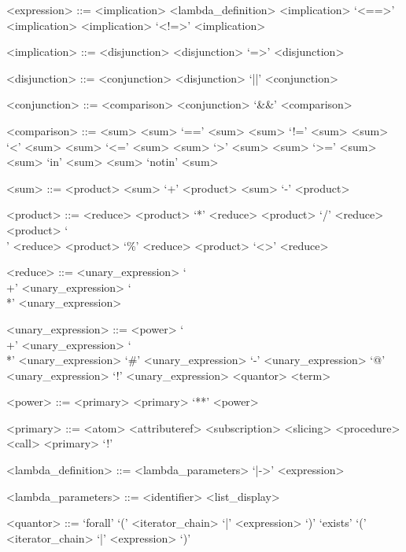 \begin{grammar}
<expression> ::= <implication>
\alt <lambda_definition>
\alt <implication> `<==>' <implication>
\alt <implication> `<!=>' <implication>

<implication> ::= <disjunction>
\alt <disjunction> `=>' <disjunction>

<disjunction> ::= <conjunction>
\alt <disjunction> `||' <conjunction>

<conjunction> ::= <comparison>
\alt <conjunction> `&&' <comparison>

<comparison> ::= <sum>
\alt <sum> `==' <sum>
\alt <sum> `!=' <sum>
\alt <sum> `<' <sum>
\alt <sum> `<=' <sum>
\alt <sum> `>' <sum>
\alt <sum> `>=' <sum>
\alt <sum> `in' <sum>
\alt <sum> `notin' <sum>

<sum> ::= <product>
\alt <sum> `+' <product>
\alt <sum> `-' <product>

<product> ::= <reduce>
\alt <product> `*' <reduce>
\alt <product> `/' <reduce>
\alt <product> `\\' <reduce>
\alt <product> `\%' <reduce>
\alt <product> `<>' <reduce>

<reduce> ::= <unary_expression>
\alt `\\+' <unary_expression>
\alt `\\*' <unary_expression>

<unary_expression> ::= <power>
\alt `\\+' <unary_expression>
\alt `\\*' <unary_expression>
\alt `#' <unary_expression>
\alt `-' <unary_expression>
\alt `@' <unary_expression>
\alt `!' <unary_expression>
\alt <quantor>
\alt <term>

<power> ::= <primary>
\alt <primary> `**' <power>

<primary> ::= <atom>
\alt <attributeref>
\alt <subscription>
\alt <slicing>
\alt <procedure>
\alt <call>
\alt <primary> `!'

\end{grammar}

%

\begin{grammar}
<lambda_definition> ::= <lambda_parameters> `|->' <expression>

<lambda_parameters> ::= <identifier>
\alt <list_display>
\end{grammar}

%

\begin{grammar}
<quantor> ::= `forall' `(' <iterator_chain> `|' <expression> `)'
\alt `exists' `(' <iterator_chain> `|' <expression> `)'
\end{grammar}

